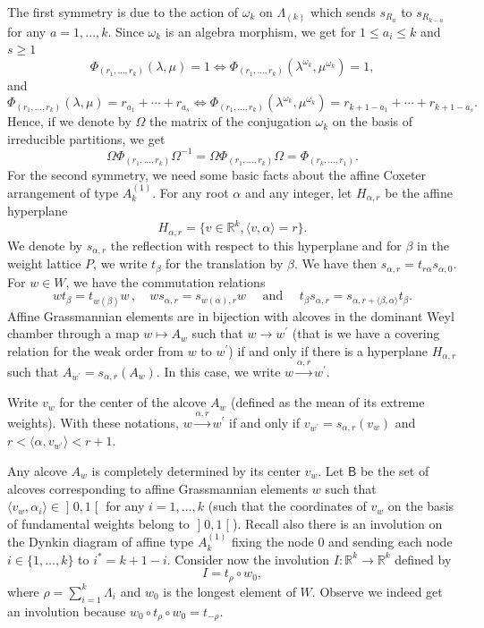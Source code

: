 \documentclass[ALCO,ThmDefs,Unicode,epreuves]{cedram}
\begin{document}
The first symmetry is due to the action of $\omega_{k}$ on $\Lambda_{(k)}$
which sends $s_{R_{a}}$ to $s_{R_{k-a}}$ for any $a=1,\ldots,k$. Since
$\omega_{k}$ is an algebra morphism, we get for $1\leq a_{i}\leq k$ and
$s\geq1$%
\[
\Phi_{(r_{1},\ldots,r_{k})}(\lambda,\mu)=1\Leftrightarrow\Phi_{(r_{1}
,\ldots,r_{k})}(\lambda^{\omega_{k}},\mu^{\omega_{k}})=1,
\]
and
\[
\Phi_{(r_{1},\ldots,r_{k})}(\lambda,\mu)=r_{a_{1}}+\cdots+r_{a_{s}
}\Leftrightarrow\Phi_{(r_{1},\ldots,r_{k})}(\lambda^{\omega_{k}},\mu
^{\omega_{k}})=r_{k+1-a_{1}}+\cdots+r_{k+1-a_{s}}.
\]
Hence, if we denote by $\Omega$ the matrix of the conjugation $\omega_{k}$ on
the basis of irreducible partitions, we get
\begin{equation}
\Omega\Phi_{(r_{1},\ldots,r_{k})}\Omega^{-1}=\Omega\Phi_{(r_{1},\ldots,r_{k}%
)}\Omega=\Phi_{(r_{k},\ldots,r_{1})}. \label{PhiConjugation}%
\end{equation}
For the second symmetry, we need some basic facts about the affine Coxeter
arrangement of type $A_{k}^{(1)}$. For any root $\alpha$ and any integer, let
$H_{\alpha,r}$ be the affine hyperplane
\[
H_{\alpha,r}=\{v\in\mathbb{R}^{k},\langle v,\alpha\rangle=r\}.
\]
We denote by $s_{\alpha,r}$ the reflection with respect to this hyperplane and
for $\beta$ in the weight lattice $P$, we write $t_{\beta}$ for the
translation by $\beta$. We have then $s_{\alpha,r}=t_{r\alpha}s_{\alpha,0}$.
For $w\in W$, we have the commutation relations
\begin{equation}
wt_{\beta}=t_{w(\beta)}w\,,\quad ws_{\alpha,r}=s_{w(\alpha),r}%
w\quad\text{ and }\quad t_{\beta}s_{\alpha,r}=s_{\alpha,r+\langle\beta
,\alpha\rangle}t_{\beta}. \label{commutRelation}%
\end{equation}
Affine Grassmannian elements are in bijection with alcoves in the dominant
Weyl chamber through a map $w\mapsto A_{w}$ such that $w\rightarrow w^{\prime
}$ (that is we have a covering relation for the weak order from $w$ to
$w^{\prime}$) if and only if there is a hyperplane $H_{\alpha,r}$ such that
$A_{w^{\prime}}=s_{\alpha,r}(A_{w})$. In this case, we write
$w\xrightarrow{\alpha,r}w^{\prime}$.

Write $v_{w}$ for the center of the alcove $A_{w}$ (defined as the mean of
its extreme weights). With these notations, $w\xrightarrow{\alpha,r}w^{\prime
}$ if and only if $v_{w^{\prime}}=s_{\alpha,r}(v_{w})$ and $r<\langle
\alpha,v_{w^{\prime}}\rangle<r+1$.

Any alcove $A_{w}$ is completely determined by its center $v_{w}$. Let
$\mathsf{B}$ be the set of alcoves corresponding to affine Grassmannian
elements $w$ such that $\langle v_{w},\alpha_{i}\rangle\in \mathopen]0,1\mathclose[$ for any
$i=1,\ldots,k$ (\ie such that the coordinates of $v_{w}$ on the basis of
fundamental weights belong to $\mathopen]0,1\mathclose[$). Recall also there is an involution on
the Dynkin diagram of affine type $A_{k}^{(1)}$ fixing the node $0$ and
sending each node $i\in\{1,\ldots,k\}$ to $i^{\ast}=k+1-i$. Consider now the
involution $I:\mathbb{R}^{k}\rightarrow\mathbb{R}^{k}$ defined by
\[
I=t_{\rho}\circ w_{0},
\]
where $\rho=\sum_{i=1}^{k}\Lambda_{i}$ and $w_{0}$ is the longest element of
$W.$ Observe we indeed get an involution because $w_{0}\circ t_{\rho}\circ
w_{0}=t_{-\rho}$.
\end{document}

